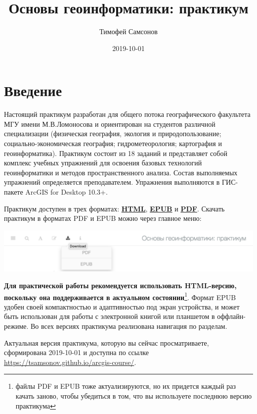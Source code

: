 \documentclass[12pt,]{book}
\title{Основы геоинформатики: практикум}
\author{Тимофей Самсонов}
\date{2019-10-01}
\let\rmarkdownfootnote\footnote%
\def\footnote{\protect\rmarkdownfootnote}
\begin{document}
\maketitle

{
\hypersetup{linkcolor=black}
\setcounter{tocdepth}{1}
\tableofcontents
}
\hypertarget{section}{%
\chapter*{Введение}\label{section}}

Настоящий практикум разработан для общего потока географического факультета МГУ имени М.В.Ломоносова и ориентирован на студентов различной специализации (физическая география, экология и природопользование; социально-экономическая география; гидрометеорология; картография и геоинформатика). Практикум состоит из 18 заданий и представляет собой комплекс учебных упражнений для освоения базовых технологий геоинформатики и методов пространственного анализа. Состав выполняемых упражнений определяется преподавателем. Упражнения выполняются в ГИС-пакете ArcGIS for Desktop 10.3+.

Практикум доступен в трех форматах: \href{https://tsamsonov.github.io/arcgis-course/}{\textbf{HTML}}, \href{https://tsamsonov.github.io/arcgis-course/arcgis-course.epub}{\textbf{EPUB}} и \href{https://tsamsonov.github.io/arcgis-course/arcgis-course.pdf}{\textbf{PDF}}. Скачать практикум в форматах PDF и EPUB можно через главное меню:

\includegraphics{images/download.png}

\textbf{Для практической работы рекомендуется использовать HTML-версию, поскольку она поддерживается в актуальном состоянии}\footnote{файлы PDF и EPUB тоже актуализируются, но их придется каждый раз качать заново, чтобы убедиться в том, что вы используете последнюю версию практикума}. Формат EPUB удобен своей компактностью и адаптивностью под экран устройства, и может быть использован для работы с электронной книгой или планшетом в оффлайн-режиме. Во всех версиях практикума реализована навигация по разделам.

Актуальная версия практикума, которую вы сейчас просматриваете, сформирована 2019-10-01 и доступна по ссылке \url{https://tsamsonov.github.io/arcgis-course/}.
\end{document}
